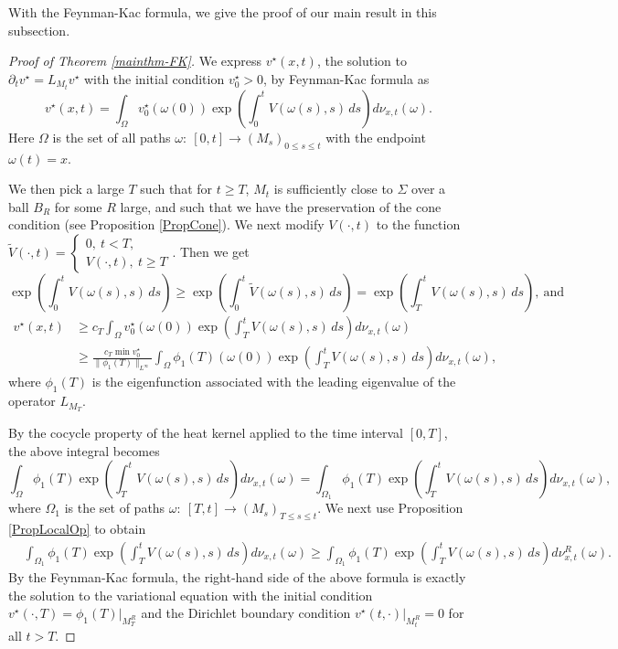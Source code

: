 \documentclass[12pt]{amsart}
\numberwithin{equation}{section}
\numberwithin{equation}{section}
\begin{document}
	With the Feynman-Kac formula, we give the proof of our main result in this subsection. 
	\begin{proof}[Proof of Theorem \ref{mainthm-FK}]
		We express $v^\star(x,t)$, the solution to $\partial_t v^\star=L_{M_t} v^\star$ with the initial condition $v^\star_0>0$, by Feynman-Kac formula as
		$$v^\star(x,t)=\int_{\Omega}v^\star_0(\omega(0))\exp\left(\int_0^t V(\omega(s),s)\,ds\right)d\nu_{x,t}(\omega).$$
		Here $\Omega$ is the set of all paths $\omega:\ [0,t]\to (M_s)_{0\leq s\leq t}$ with the endpoint $\omega(t)=x$. 
		
		We then pick a large $T$ such that for $t\geq T$, $M_t$ is sufficiently close to $\Sigma$ over a ball $B_R$ for some $R$ large, and such that we have the preservation of the cone condition (see Proposition \ref{PropCone}). 
		We next modify $V(\cdot, t)$ to the function $\widetilde V(\cdot,t)=\begin{cases}0,\ t<T,\\
			V(\cdot,t),\ t\geq T
		\end{cases}$. Then we get $$\exp\left(\int_0^t V(\omega(s),s)\,ds\right)\geq \exp\left(\int_0^t \widetilde V(\omega(s),s)\,ds\right)=\exp\left(\int_T^t V(\omega(s),s)\,ds\right),\ \mathrm{and}\ $$
		\begin{equation*}
			\begin{aligned}
				v^\star(x,t)&\geq c_T\int_{\Omega}v^\star_0(\omega(0))\exp\left(\int_T^t V(\omega(s),s)\,ds\right)d\nu_{x,t}(\omega)\\
				&\geq \frac{c_T\min v^\star_0}{\|\phi_1(T)\|_{L^\infty}}\int_{\Omega}\phi_1(T)(\omega(0))\exp\left(\int_T^t V(\omega(s),s)\,ds\right) d\nu_{x,t}(\omega),
			\end{aligned}
		\end{equation*}
		where $\phi_1(T)$ is the eigenfunction associated with the leading eigenvalue of the operator $L_{M_T}$.
		
		By the cocycle property of the heat kernel applied to the time interval $[0,T]$, the above integral becomes $$\int_{\Omega}\phi_1(T)\exp\left(\int_T^t V(\omega(s),s)\,ds\right)d\nu_{x,t}(\omega)=\int_{\Omega_1}\phi_1(T)\exp\left(\int_T^t V(\omega(s),s)\,ds\right)d\nu_{x,t}(\omega),$$
		where $\Omega_1$ is the set of paths $\omega:\ [T,t]\to (M_s)_{T\leq s\leq t}$.
		We next use Proposition \ref{PropLocalOp} to obtain 
		\begin{equation*}
			\begin{aligned}
				&\int_{\Omega_1}\phi_1(T)\exp\left(\int_T^t V(\omega(s),s)\,ds\right)d\nu_{x,t}(\omega)
				\geq\int_{\Omega_1}\phi_1(T)\exp\left(\int_T^t V(\omega(s),s)\,ds\right)d\nu^R_{x,t}(\omega).
			\end{aligned}
		\end{equation*}
		By the Feynman-Kac formula, the right-hand side of the above formula is exactly the solution to the variational equation with the initial condition $v^\star(\cdot ,T)=\phi_1(T)|_{M_T^R}$ and the Dirichlet boundary condition $v^\star(t,\cdot)|_{M_t^R}=0$ for all $t>T$. 
		

\end{proof}
\end{document}
